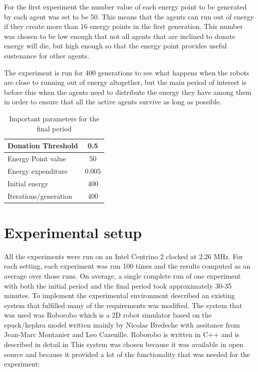 \documentclass[a4paper]{book}
\begin{document}
For the first experiment the number value of each energy point to be generated by each agent was set to be 50. 
This means that the agents can run out of energy if they create more than 16 energy points in the first generation.
This number was chosen to be low enough that not all agents that are inclined to donate energy will die, but 
high enough so that the energy point provides useful sustenance for other agents. 

The experiment is run for 400 generations to see what happens when the robots are close to running out of energy altogether, but the main period of interest is before this when the agents need to distribute the energy they have among them in order to ensure that all the active agents survive as long as possible.


\begin{table}[htdp]
\begin{center}
\begin{tabular}{|l|c|}\hline
Donation Threshold    &  0.5  \\\hline\hline
Energy Point value    &  50  \\\hline\hline
Energy expenditure    &  0.005 \\\hline\hline
Initial energy 		& 400 \\\hline\hline
Iterations/generation & 400 \\\hline\hline
\end{tabular}
\end{center}
\label{table:parameteres2}
\caption{Important parameters for the final period}
\end{table}
\section{Experimental setup}

All the experiments were run on an Intel Centrino 2 clocked at 2.26 MHz. For each setting, each experiment was run 100 times and the results computed as an average over those runs. 
On average, a single complete run of one experiment with both the initial period and the final period took approximately 30-35 minutes. 
To implement the experimental environment described an existing system that fulfilled many of the requirements was modified.
The system that was used was Roborobo which is a 2D robot simulator based on the epuck/kephra model written mainly by Nicolas Bredeche with assitance from Jean-Marc Montanier and Leo Cazenille. Roborobo is written in C++ and is described in detail in \cite{roborobo}
This system was chosen because it was available in open source and because it provided a lot of the functionality that was needed for the experiment:
\end{document}
